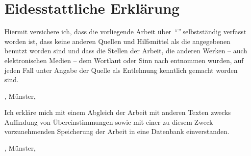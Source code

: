 \chapter*{Eidesstattliche Erklärung}
\pagestyle{plain}
\rohead{ } %
\lehead{ } 
Hiermit versichere ich, dass die vorliegende Arbeit über \textit{\enquote{\tTitle}} selbstständig verfasst worden ist, dass keine anderen Quellen und Hilfsmittel als die angegebenen benutzt worden sind und dass die Stellen der Arbeit, die anderen Werken – auch elektronischen Medien – dem Wortlaut oder Sinn nach entnommen wurden, auf jeden Fall unter Angabe der Quelle als Entlehnung kenntlich gemacht worden sind.

\vspace{1cm}

\parbox{20em}{\hrulefill}

\tAuthor, Münster, 

\vspace{1cm}

Ich erkläre mich mit einem Abgleich der Arbeit mit anderen Texten zwecks Auffindung von Übereinstimmungen sowie mit einer zu diesem Zweck vorzunehmenden Speicherung der Arbeit in eine Datenbank einverstanden.

\vspace{1cm}

\parbox{20em}{\hrulefill}

\tAuthor, Münster,  